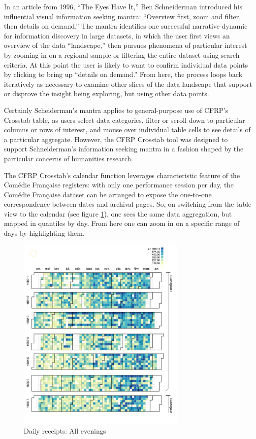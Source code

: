\documentclass[	DIV=calc,%
							paper=a4,%
							fontsize=11pt,%
							twocolumn]{scrartcl}	 					%
\begin{document}
In an article from 1996, ``The Eyes Have It,'' Ben Schneiderman introduced his influential visual information seeking mantra: ``Overview first, zoom and filter, then details on demand.''\cite{Shneiderman:1996}  The mantra identifies one successful narrative dynamic for information discovery in large datasets, in which the user first views an overview of the data ``landscape,'' then pursues phenomena of particular interest by zooming in on a regional sample or filtering the entire dataset using search criteria.  At this point the user is likely to want to confirm individual data points by clicking to bring up ``details on demand.''  From here, the process loops back iteratively as necessary to examine other slices of the data landscape that support or disprove the insight being exploring, but using other data points.

Certainly Scheiderman’s mantra applies to general-purpose use of CFRP’s Crosstab table, as users select data categories, filter or scroll down to particular columns or rows of interest, and mouse over individual table cells to see details of a particular aggregate.  However, the CFRP Crosstab tool was designed to support Schneiderman’s information seeking mantra in a fashion shaped by the particular concerns of humanities research.

The CFRP Crosstab’s calendar function leverages characteristic feature of the Comédie Française registers: with only one performance session per day, the Comédie Française dataset can be arranged to expose the one-to-one correspondence between dates and archival pages.  So, on switching from the table view to the calendar (see figure \ref{fig:calendar-receipts}), one sees the same data aggregation, but mapped in quantiles by day.  From here one can zoom in on a specific range of days by highlighting them.

\begin{figure}
  \centering
	\includegraphics[width=3.25in]{steps/calendar-receipts.png}
	\caption{Daily receipts: All evenings}
	\label{fig:calendar-receipts}
\end{figure}
\end{document}
